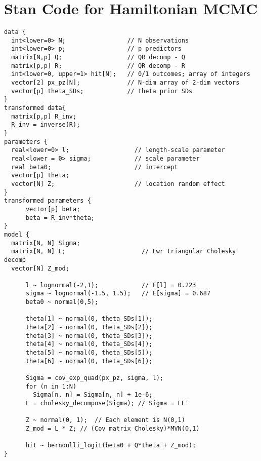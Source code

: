 \documentclass{article}
\begin{document}
\appendix
\section{Stan Code for Hamiltonian MCMC}
\begin{verbatim}
data {                             
  int<lower=0> N;                 // N observations
  int<lower=0> p;                 // p predictors
  matrix[N,p] Q;                  // QR decomp - Q
  matrix[p,p] R;                  // QR decomp - R
  int<lower=0, upper=1> hit[N];   // 0/1 outcomes; array of integers
  vector[2] px_pz[N];             // N-dim array of 2-dim vectors
  vector[p] theta_SDs;            // theta prior SDs
}
transformed data{
  matrix[p,p] R_inv;
  R_inv = inverse(R);
}
parameters {                
  real<lower=0> l;                  // length-scale parameter
  real<lower = 0> sigma;            // scale parameter
  real beta0;                       // intercept 
  vector[p] theta;
  vector[N] Z;                      // location random effect
}
transformed parameters {
      vector[p] beta;
      beta = R_inv*theta;
}
model {  
  matrix[N, N] Sigma;
  matrix[N, N] L;                     // Lwr triangular Cholesky decomp
  vector[N] Z_mod;
      
      l ~ lognormal(-2,1);            // E[l] = 0.223
      sigma ~ lognormal(-1.5, 1.5);   // E[sigma] = 0.687
      beta0 ~ normal(0,5);
      
      theta[1] ~ normal(0, theta_SDs[1]);
      theta[2] ~ normal(0, theta_SDs[2]);
      theta[3] ~ normal(0, theta_SDs[3]);
      theta[4] ~ normal(0, theta_SDs[4]);
      theta[5] ~ normal(0, theta_SDs[5]);
      theta[6] ~ normal(0, theta_SDs[6]);
      
      Sigma = cov_exp_quad(px_pz, sigma, l); 
      for (n in 1:N)
        Sigma[n, n] = Sigma[n, n] + 1e-6;
      L = cholesky_decompose(Sigma); // Sigma = LL' 
      
      Z ~ normal(0, 1);  // Each element is N(0,1)
      Z_mod = L * Z; // (Cov matrix Cholesky)*MVN(0,1)
      
      hit ~ bernoulli_logit(beta0 + Q*theta + Z_mod);
}
\end{verbatim}



\end{document}
